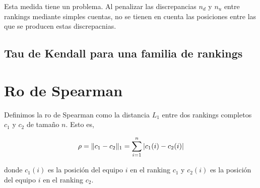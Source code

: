 Esta medida tiene un problema. Al penalizar las discrepancias $n_d$ y $n_u$ entre rankings mediante simples cuentas, no se tienen en cuenta las posiciones entre las que se producen estas discrepacnias.

\subsection{Tau de Kendall para una familia de rankings}


\section{Ro de Spearman}

\begin{defi}[Ro de Spearman]
Definimos la ro de Spearman como la distancia $L_1$ entre dos rankings completos $c_1$ y $c_2$ de tamaño $n$. Esto es, 

\begin{equation}
\rho = \lVert c_1 - c_2 \rVert_1 = \sum\limits_{i=1}^{n} |c_1(i) - c_2(i)|
\end{equation}

donde $c_1(i)$ es la posición del equipo $i$ en el ranking $c_1$ y $c_2(i)$ es la posición del equipo $i$ en el ranking $c_2$.
\end{defi}

